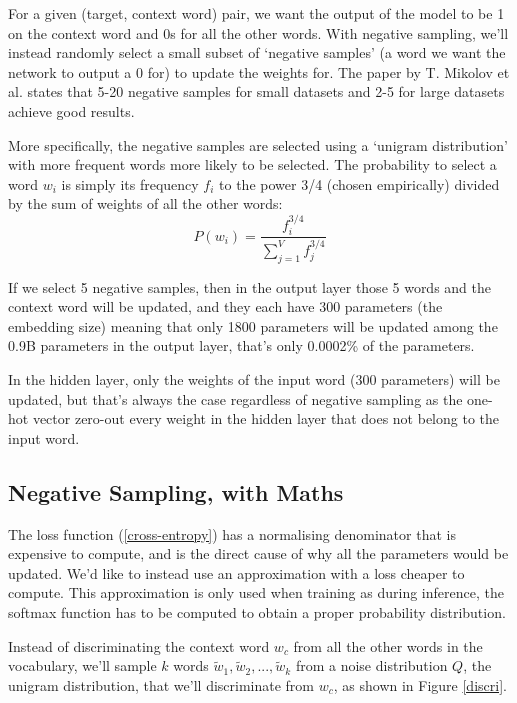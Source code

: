 For a given (target, context word) pair, we want the output of the model to be 1 on the context word and 0s for all the other words. With negative sampling, we'll instead randomly select a small subset of `negative samples' (a word we want the network to output a 0 for) to update the weights for. The paper by T. Mikolov et al. \cite{word2vec2} states that 5-20 negative samples for small datasets and 2-5 for large datasets achieve good results.

More specifically, the negative samples are selected using a `unigram distribution' with more frequent words more likely to be selected. The probability to select a word $w_i$ is simply its frequency $f_i$ to the power 3/4 (chosen empirically) divided by the sum of weights of all the other words:
\begin{equation}
    P(w_i) = \frac{f_i^{3/4}}{\sum_{j=1}^V f_j^{3/4}}
\end{equation}

If we select 5 negative samples, then in the output layer those 5 words and the context word will be updated, and they each have 300 parameters (the embedding size) meaning that only 1800 parameters will be updated among the 0.9B parameters in the output layer, that's only 0.0002\% of the parameters.

In the hidden layer, only the weights of the input word (300 parameters) will be updated, but that's always the case regardless of negative sampling as the one-hot vector zero-out every weight in the hidden layer that does not belong to the input word.

\subsection{Negative Sampling, with Maths}
The loss function (\ref{cross-entropy}) has a normalising denominator that is expensive to compute, and is the direct cause of why all the parameters would be updated. We'd like to instead use an approximation with a loss cheaper to compute. This approximation is only used when training as during inference, the softmax function has to be computed to obtain a proper probability distribution.

Instead of discriminating the context word $w_c$ from all the other words in the vocabulary, we'll sample $k$ words $\tilde{w}_1, \tilde{w}_2, ..., \tilde{w}_k$ from a noise distribution $Q$, the unigram distribution, that we'll discriminate from $w_c$, as shown in Figure \ref{discri}.

